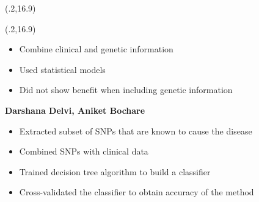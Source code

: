 \documentclass[final]{beamer}
\begin{document}
\begin{frame}{}
\begin{textblock}{23}(.2,16.9)
\begin{block}{\vskip 1in}
\end{block}
\end{textblock}


\begin{textblock}{8.1}(.2,16.9)




\begin{itemize}
\item <1-> Combine clinical and genetic information
\item <1-> Used statistical models
\item <1-> Did not show benefit when including genetic information 

\end{itemize}

\begin{center}{\bf Darshana Delvi, Aniket Bochare} \end{center}

\begin{itemize}

\item<1-> Extracted subset of SNPs that are known to cause the disease

\item<1-> Combined SNPs with clinical data

\item<1-> Trained decision tree algorithm to build a classifier

\item<1-> Cross-validated the classifier to obtain accuracy of the method


\end{itemize}
\end{textblock}
\end{frame}
\end{document}
